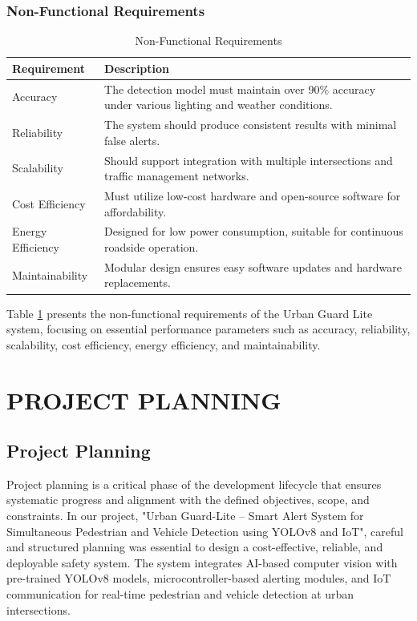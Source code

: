 \documentclass[a4paper, 12pt]{report}
\begin{document}
\subsection{Non-Functional Requirements}
\begin{table}[H]
\centering
\caption{Non-Functional Requirements}\label{tab:non_functional_requirements}
\begin{tabular}{|p{}|p{}|}
    \hline
    \textbf{Requirement} & \textbf{Description} \\ \hline
    Accuracy & The detection model must maintain over 90\% accuracy under various lighting and weather conditions. \\ \hline
    Reliability & The system should produce consistent results with minimal false alerts. \\ \hline
    Scalability & Should support integration with multiple intersections and traffic management networks. \\ \hline
    Cost Efficiency & Must utilize low-cost hardware and open-source software for affordability. \\ \hline
    Energy Efficiency & Designed for low power consumption, suitable for continuous roadside operation. \\ 
    \hline
    Maintainability & Modular design ensures easy software updates and hardware replacements. \\
    \hline
\end{tabular}
\end{table}

Table \ref{tab:non_functional_requirements} presents the non-functional requirements of the Urban Guard Lite system, focusing on essential performance parameters such as accuracy, reliability, scalability, cost efficiency, energy efficiency, and maintainability.



\chapter{PROJECT PLANNING}

\section{Project Planning}

Project planning is a critical phase of the development lifecycle that ensures systematic progress and alignment with the defined objectives, scope, and constraints. In our project, "Urban Guard-Lite – Smart Alert System for Simultaneous Pedestrian and Vehicle Detection using YOLOv8 and IoT", careful and structured planning was essential to design a cost-effective, reliable, and deployable safety system. The system integrates AI-based computer vision with pre-trained YOLOv8 models, microcontroller-based alerting modules, and IoT communication for real-time pedestrian and vehicle detection at urban intersections.
\end{document}
